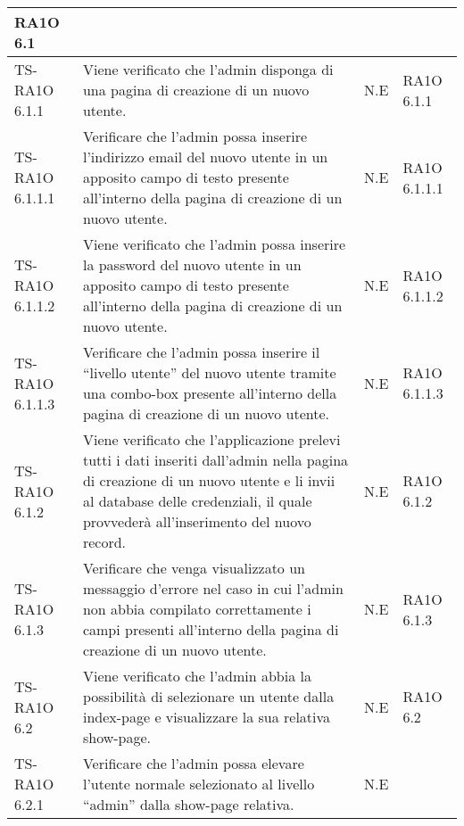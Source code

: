 \begin{center}
\begin{longtable}{| p{3cm} | p{6cm} | p{1.5cm} | p{2cm} | }
            RA1O 6.1 \newline  \\ \hline 
        TS-RA1O 6.1.1 & 
        Viene verificato che l'admin disponga di una pagina di creazione di un nuovo utente. & N.E &       
            RA1O 6.1.1 \newline  \\ \hline 
        TS-RA1O 6.1.1.1 & 
        Verificare che l'admin possa inserire l'indirizzo email del nuovo utente in un apposito campo di testo presente all'interno della pagina di creazione di un nuovo utente. & N.E &       
            RA1O 6.1.1.1 \newline  \\ \hline 
        TS-RA1O 6.1.1.2 & 
        Viene verificato che l'admin possa inserire la password del nuovo utente in un apposito campo di testo presente all'interno della pagina di creazione di un nuovo utente. & N.E &       
            RA1O 6.1.1.2 \newline  \\ \hline 
        TS-RA1O 6.1.1.3 & 
        Verificare che l'admin possa inserire il ``livello utente'' del nuovo utente tramite una combo-box presente all'interno della pagina di creazione di un nuovo utente. & N.E &       
            RA1O 6.1.1.3 \newline  \\ \hline 
        TS-RA1O 6.1.2 & 
        Viene verificato che l'applicazione prelevi tutti i dati inseriti dall'admin nella pagina di creazione di un nuovo utente e li invii al database delle credenziali, il quale provvederà all'inserimento del nuovo record. & N.E &       
            RA1O 6.1.2 \newline  \\ \hline 
        TS-RA1O 6.1.3 & 
        Verificare che venga visualizzato un messaggio d'errore nel caso in cui l'admin non abbia compilato correttamente i campi presenti all'interno della pagina di creazione di un nuovo utente. & N.E &       
            RA1O 6.1.3 \newline  \\ \hline 
        TS-RA1O 6.2 & 
        Viene verificato che l'admin abbia la possibilità di selezionare un utente dalla index-page e visualizzare la sua relativa show-page. & N.E &       
            RA1O 6.2 \newline  \\ \hline 
        TS-RA1O 6.2.1 & 
        Verificare che l'admin possa elevare l'utente normale selezionato al livello ``admin'' dalla show-page relativa. & N.E &       

\end{longtable}
\end{center}
